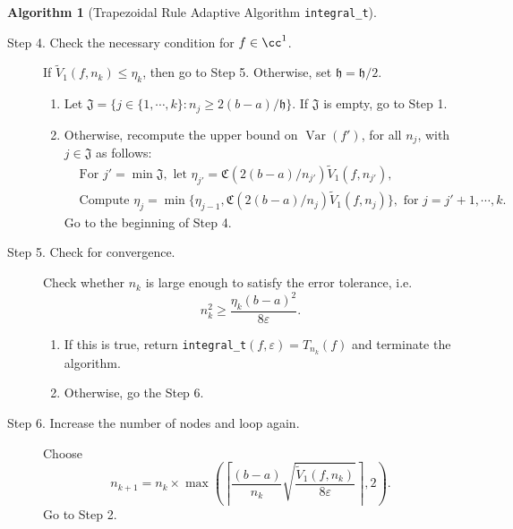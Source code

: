 \documentclass{iitthesis}
\DeclareMathOperator{\Var}{Var}
\theoremstyle{definition}
\newtheorem{algo}{Algorithm}
\theoremstyle{remark}
\begin{document}
\begin{algo}[Trapezoidal Rule Adaptive Algorithm {\tt integral\_t}]
\begin{description}
\item[Step 4. Check the necessary condition for $f \in \cc^1$.] If $\widetilde{V}_1(f,n_k) \le \eta_{k}$, then go to Step 5.
  Otherwise, set $\mathfrak{h} = \mathfrak{h}/2$.
    \begin{enumerate}[label=\alph*)]
      \item Let $\mathfrak{J}=\{j\in\{1, \cdots, k\}: n_{j}\ge 2(b-a)/\mathfrak{h}\}$. If $\mathfrak{J}$ is empty, go to Step 1.
      \item Otherwise, recompute the upper bound on $\Var(f')$, for all $n_{j}$, with $j \in \mathfrak{J}$ as follows:
      \begin{align*}
        &\text{For } j'=\min\mathfrak{J}, \text{ let } \eta_{j'}=\mathfrak{C}(2(b-a)/n_{j'})\widetilde{V}_1(f,n_{j'}), \\
        &\text{Compute } \eta_{j}=\min\{\eta_{j-1},\mathfrak{C}(2(b-a)/n_{j})\widetilde{V}_1(f,n_{j})\}, \text{ for } j=j'+1, \cdots, k.
      \end{align*}
        Go to the beginning of Step 4.
    \end{enumerate}


\item[Step 5. Check for convergence.] Check whether $n_k$ is large enough to satisfy the error tolerance, i.e.
    \begin{equation*}
         n_k^2 \ge \frac{\eta_{k}(b-a)^2}{8\varepsilon }.
    \end{equation*}

    \begin{enumerate}[label=\alph*)]
      \item If this is true, return {\tt integral\_t}$(f,\varepsilon)=T_{n_k}(f)$ and terminate the algorithm.
      \item Otherwise, go the Step 6.
    \end{enumerate}


\item[Step 6. Increase the number of nodes and loop again.] Choose
$$
n_{k+1}=n_k\times\max\left(\left\lceil\frac{(b-a)}{n_{k}}\sqrt{\frac{\widetilde{V}_1(f,n_k)}{8\varepsilon}}\right\rceil,2\right).
$$
Go to Step 2.
\end{description}
\end{algo}
\end{document}
